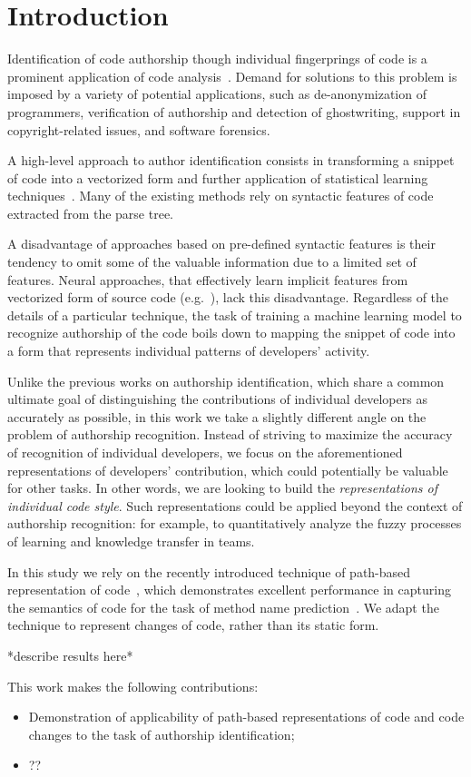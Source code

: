 \section{Introduction}
Identification of code authorship though individual fingerprings of code is a 
prominent application of code analysis~\cite{caliskan2015anonymizing}. Demand 
for solutions to this problem is imposed by a variety of potential applications,
such as de-anonymization of programmers, verification of authorship and 
detection of ghostwriting, support in copyright-related issues, and software 
forensics.

A high-level approach to author identification consists in transforming a snippet of code into a vectorized form and further application of statistical learning techniques~\cite{}. Many of the existing methods rely on syntactic features of code extracted from the parse tree.~\cite{}

A disadvantage of approaches based on pre-defined syntactic features is their tendency to omit some of the valuable information due to a limited set of features. Neural approaches, that effectively learn implicit features from vectorized form of source code (e.g.~\cite{alsulami2017source}), lack this disadvantage. Regardless of the details of a particular technique, the task of training a machine learning model to recognize authorship of the code boils down to mapping the snippet of code into a form that represents individual patterns of developers' activity.

Unlike the previous works on authorship identification, which share a common ultimate goal of distinguishing the contributions of individual developers as accurately as possible, in this work we take a slightly different angle on the problem of authorship recognition. Instead of striving to maximize the accuracy of recognition of individual developers, we focus on the aforementioned representations of developers' contribution, which could potentially be valuable for other tasks. In other words, we are looking to build the \emph{representations of individual code style}. Such representations could be applied beyond the context of authorship recognition: for example, to quantitatively analyze the fuzzy processes of learning and knowledge transfer in teams.

In this study we rely on the recently introduced technique of path-based representation of code~\cite{alon2018general}, which demonstrates excellent performance in capturing the semantics of code for the task of method name prediction~\cite{alon2018code2vec}. We adapt the technique to represent changes of code, rather than its static form.

*describe results here*

This work makes the following contributions:
\begin{itemize}
    \item{Demonstration of applicability of path-based representations of code and code changes to the task of authorship identification;}
    \item{??}
\end{itemize}


